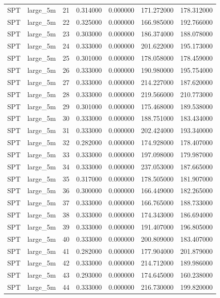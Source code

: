 \begin{tabular}{llrrrrr}
SPT & large_5m & 21 & 0.314000 & 0.000000 & 171.272000 & 178.312000 \\
SPT & large_5m & 22 & 0.325000 & 0.000000 & 166.985000 & 192.766000 \\
SPT & large_5m & 23 & 0.303000 & 0.000000 & 186.374000 & 188.078000 \\
SPT & large_5m & 24 & 0.333000 & 0.000000 & 201.622000 & 195.173000 \\
SPT & large_5m & 25 & 0.301000 & 0.000000 & 178.058000 & 178.459000 \\
SPT & large_5m & 26 & 0.333000 & 0.000000 & 190.980000 & 195.754000 \\
SPT & large_5m & 27 & 0.333000 & 0.000000 & 214.227000 & 187.620000 \\
SPT & large_5m & 28 & 0.333000 & 0.000000 & 219.566000 & 210.773000 \\
SPT & large_5m & 29 & 0.301000 & 0.000000 & 175.468000 & 189.538000 \\
SPT & large_5m & 30 & 0.333000 & 0.000000 & 188.751000 & 183.434000 \\
SPT & large_5m & 31 & 0.333000 & 0.000000 & 202.424000 & 193.340000 \\
SPT & large_5m & 32 & 0.282000 & 0.000000 & 174.928000 & 178.407000 \\
SPT & large_5m & 33 & 0.333000 & 0.000000 & 197.098000 & 179.987000 \\
SPT & large_5m & 34 & 0.333000 & 0.000000 & 237.053000 & 187.665000 \\
SPT & large_5m & 35 & 0.317000 & 0.000000 & 178.505000 & 181.907000 \\
SPT & large_5m & 36 & 0.300000 & 0.000000 & 166.449000 & 182.265000 \\
SPT & large_5m & 37 & 0.333000 & 0.000000 & 166.765000 & 188.733000 \\
SPT & large_5m & 38 & 0.333000 & 0.000000 & 174.343000 & 186.694000 \\
SPT & large_5m & 39 & 0.333000 & 0.000000 & 191.407000 & 196.805000 \\
SPT & large_5m & 40 & 0.333000 & 0.000000 & 200.809000 & 183.407000 \\
SPT & large_5m & 41 & 0.282000 & 0.000000 & 177.904000 & 201.879000 \\
SPT & large_5m & 42 & 0.333000 & 0.000000 & 214.712000 & 189.986000 \\
SPT & large_5m & 43 & 0.293000 & 0.000000 & 174.645000 & 160.238000 \\
SPT & large_5m & 44 & 0.333000 & 0.000000 & 216.730000 & 199.820000 \\

\end{tabular}
